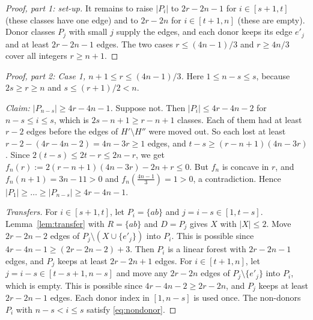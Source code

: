 \documentclass[11pt]{amsart}
\theoremstyle{definition}
\theoremstyle{remark}
\begin{document}
\begin{proof}[Proof, part 1: set-up]
It remains to raise $|P_i|$ to $2r-2n-1$ for $i\in[s+1,t]$ (these classes have one edge) and
to $2r-2n$ for $i\in[t+1,n]$ (these are empty). Donor classes $P_j$ with small $j$ supply the
edges, and each donor keeps its edge $e'_j$ and at least $2r-2n-1$ edges. The two cases
$r\le(4n-1)/3$ and $r\ge 4n/3$ cover all integers $r\ge n+1$.
\end{proof}

\begin{proof}[Proof, part 2: Case 1, $n+1\le r\le(4n-1)/3$]
Here $1\le n-s\le s$, because $2s\ge r\ge n$ and $s\le(r+1)/2<n$.

\emph{Claim: $|P_{n-s}|\ge 4r-4n-1$.} Suppose not. Then $|P_i|\le 4r-4n-2$ for
$n-s\le i\le s$, which is $2s-n+1\ge r-n+1$ classes. Each of them had at least $r-2$ edges
before the edges of $H'\setminus H''$ were moved out. So each lost at least
$r-2-(4r-4n-2)=4n-3r\ge1$ edges, and
$t-s\ge(r-n+1)(4n-3r)$. Since $2(t-s)\le 2t-r\le 2n-r$, we get
$f_n(r):=2(r-n+1)(4n-3r)-2n+r\le0$. But $f_n$ is concave in $r$, and
$f_n(n+1)=3n-11>0$ and $f_n(\tfrac{4n-1}{3})=1>0$, a contradiction. Hence
$|P_1|\ge\dots\ge|P_{n-s}|\ge 4r-4n-1$.

\emph{Transfers.} For $i\in[s+1,t]$, let $P_i=\{ab\}$ and $j=i-s\in[1,t-s]$. Lemma~\ref{lem:transfer}
with $R=\{ab\}$ and $D=P_j$ gives $X$ with $|X|\le2$. Move $2r-2n-2$ edges of
$P_j\setminus(X\cup\{e'_j\})$ into $P_i$. This is possible since $4r-4n-1\ge(2r-2n-2)+3$. Then
$P_i$ is a linear forest with $2r-2n-1$ edges, and $P_j$ keeps at least $2r-2n+1$ edges.
For $i\in[t+1,n]$, let $j=i-s\in[t-s+1,n-s]$ and move any $2r-2n$ edges of
$P_j\setminus\{e'_j\}$ into $P_i$, which is empty. This is possible since
$4r-4n-2\ge 2r-2n$, and $P_j$ keeps at least $2r-2n-1$ edges. Each donor index in $[1,n-s]$ is
used once. The non-donors $P_i$ with $n-s<i\le s$ satisfy \eqref{eq:nondonor}.
\end{proof}
\end{document}
